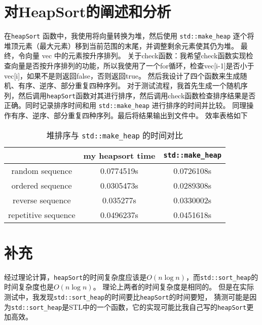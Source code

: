 \documentclass[UTF8]{ctexart}
\begin{document}
\pagestyle{fancy}
\fancyhead{}

\section{对HeapSort的阐述和分析}
在\texttt{heapSort} 函数中，我使用将向量转换为堆，然后使用 \texttt{std::make\_heap} 逐个将堆顶元素（最大元素）移到当前范围的末尾，并调整剩余元素使其仍为堆。
最终，令向量 vec 中的元素按升序排列。
关于check函数：我希望check函数实现检查向量是否按升序排列的功能，所以我使用了一个for循环，检查vec[i-1]是否小于vec[i]，如果不是则返回false，否则返回true。  
然后我设计了四个函数来生成随机、有序、逆序、部分重复四种序列。
对于测试流程，我首先生成一个随机序列，然后调用\texttt{heapSort}函数对其进行排序，然后调用check函数检查排序结果是否正确。同时记录排序时间和用 \texttt{std::make\_heap} 进行排序的时间并比较。
同理操作有序、逆序、部分重复四种序列。最后将结果输出到文件中。
效率表格如下


\begin{table}[h!]
\centering
\begin{tabular}{|c|c|c|}
\hline
 & my heapsort time &\texttt{std::make\_heap} \\
\hline
random sequence & 0.0774519s & 0.0726108s \\
\hline
ordered sequence & 0.0305473s & 0.0289308s \\
\hline
reverse sequence & 0.035277s & 0.0330002s \\
\hline
repetitive sequence & 0.0496237s & 0.0451618s \\
\hline
\end{tabular}
\caption{堆排序与 \texttt{std::make\_heap}  的时间对比}
\label{tab:example}
\end{table}


\section{补充}

经过理论计算，\texttt{heapSort}的时间复杂度应该是$O(n\log n)$，而\texttt{std::sort\_heap}的时间复杂度也是$O(n\log n)$。
理论上两者的时间复杂度是相同的。
但是在实际测试中，我发现\texttt{std::sort\_heap}的时间要比\texttt{heapSort}的时间要短，
猜测可能是因为\texttt{std::sort\_heap}是STL中的一个函数，它的实现可能比我自己写的\texttt{heapSort}更加高效。
\end{document}
